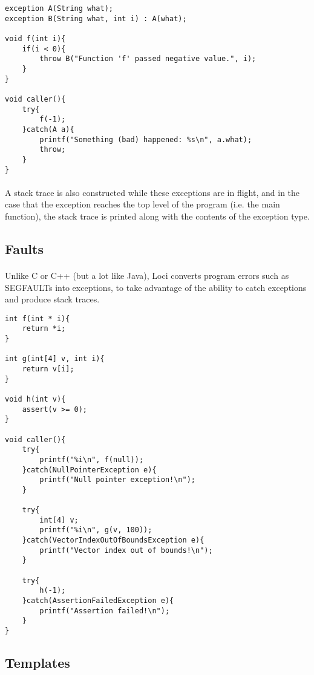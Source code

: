 \documentclass[12pt,twoside,notitlepage]{report}
\begin{document}
\small{
\begin{verbatim}
exception A(String what);
exception B(String what, int i) : A(what);

void f(int i){
    if(i < 0){
        throw B("Function 'f' passed negative value.", i);
    }
}

void caller(){
    try{
        f(-1);
    }catch(A a){
        printf("Something (bad) happened: %s\n", a.what);
        throw;
    }
}
\end{verbatim}
}

\paragraph{}
A stack trace is also constructed while these exceptions are in flight, and in the case that the exception reaches the top level of the program (i.e. the main function), the stack trace is printed along with the contents of the exception type.

\subsection{Faults}

\paragraph{}
Unlike C or C++ (but a lot like Java), Loci converts program errors such as SEGFAULTs into exceptions, to take advantage of the ability to catch exceptions and produce stack traces.

\small{
\begin{verbatim}
int f(int * i){
    return *i;
}

int g(int[4] v, int i){
    return v[i];
}

void h(int v){
    assert(v >= 0);
}

void caller(){
    try{
        printf("%i\n", f(null));
    }catch(NullPointerException e){
        printf("Null pointer exception!\n");
    }
    
    try{
        int[4] v;
        printf("%i\n", g(v, 100));
    }catch(VectorIndexOutOfBoundsException e){
        printf("Vector index out of bounds!\n");
    }
    
    try{
        h(-1);
    }catch(AssertionFailedException e){
        printf("Assertion failed!\n");
    }
}
\end{verbatim}
}

\subsection{Templates}
\end{document}
